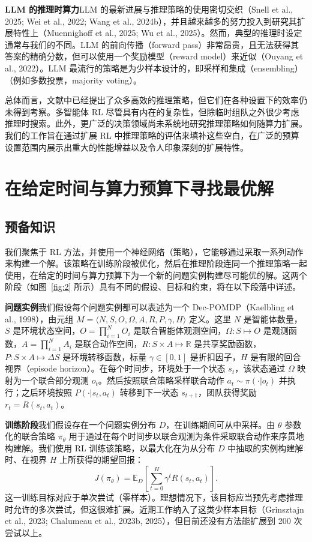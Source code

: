 \documentclass[11pt,UTF8,fontset=fandol]{ctexart}
\begin{document}
\textbf{LLM 的推理时算力}\quad LLM 的最新进展与推理策略的使用密切交织（Snell et al., 2025; Wei et al., 2022; Wang et al., 2024b），并且越来越多的努力投入到研究其扩展特性上（Muennighoff et al., 2025; Wu et al., 2025）。然而，典型的推理时设定通常与我们的不同。LLM 的前向传播（forward pass）非常昂贵，且无法获得其答案的精确分数，但可以使用一个奖励模型（reward model）来近似（Ouyang et al., 2022）。LLM 最流行的策略是为少样本设计的，即采样和集成（ensembling）（例如多数投票，majority voting）。

总体而言，文献中已经提出了众多高效的推理策略，但它们在各种设置下的效率仍未得到考察。多智能体 RL 尽管具有内在的复杂性，但除临时组队之外很少考虑推理时搜索。此外，更广泛的决策领域尚未系统地研究推理策略如何随算力扩展。我们的工作旨在通过扩展 RL 中推理策略的评估来填补这些空白，在广泛的预算设置范围内展示出重大的性能增益以及令人印象深刻的扩展特性。

\section{在给定时间与算力预算下寻找最优解}

\subsection{预备知识}

我们聚焦于 RL 方法，并使用一个神经网络（策略），它能够通过采取一系列动作来构建一个解。该策略在训练阶段被优化，然后在推理阶段连同一个推理策略一起使用，在给定的时间与算力预算下为一个新的问题实例构建尽可能优的解。这两个阶段（如图~\ref{fig:2} 所示）具有不同的假设、目标和约束，将在以下段落中详述。

\textbf{问题实例}\quad 我们假设每个问题实例都可以表述为一个 Dec-POMDP（Kaelbling et al., 1998），由元组 $M = \langle N, S, O, \Omega, A, R, P, \gamma, H \rangle$ 定义。这里 $N$ 是智能体数量，$S$ 是环境状态空间，$O = \prod_{i=1}^{N} O_i$ 是联合智能体观测空间，$\Omega : S \mapsto O$ 是观测函数，$A = \prod_{i=1}^{N} A_i$ 是联合动作空间，$R : S \times A \mapsto \mathbb{R}$ 是共享奖励函数，$P : S \times A \mapsto \Delta S$ 是环境转移函数，标量 $\gamma \in [0, 1]$ 是折扣因子，$H$ 是有限的回合视界（episode horizon）。在每个时间步，环境处于一个状态 $s_t$，该状态通过 $\Omega$ 映射为一个联合部分观测 $o_t$。然后按照联合策略采样联合动作 $a_t \sim \pi(\cdot | o_t)$ 并执行；之后环境按照 $P(\cdot | s_t, a_t)$ 转移到下一状态 $s_{t+1}$，团队获得奖励 $r_t = R(s_t, a_t)$。

\textbf{训练阶段}\quad 我们假设存在一个问题实例分布 $D$，在训练期间可从中采样。由 $\theta$ 参数化的联合策略 $\pi_\theta$ 用于通过在每个时间步以联合观测为条件采取联合动作来序贯地构建解。我们使用 RL 训练该策略，以最大化在为从分布 $D$ 中抽取的实例构建解时、在视界 $H$ 上所获得的期望回报：
\[
J(\pi_\theta) = \mathbb{E}_D \left[ \sum_{t=0}^{H} \gamma^t R(s_t, a_t) \right].
\]
这一训练目标对应于单次尝试（零样本）。理想情况下，该目标应当预先考虑推理时允许的多次尝试，但这很难扩展。近期工作纳入了这类少样本目标（Grinsztajn et al., 2023; Chalumeau et al., 2023b, 2025），但目前还没有方法能扩展到 200 次尝试以上。
\end{document}
